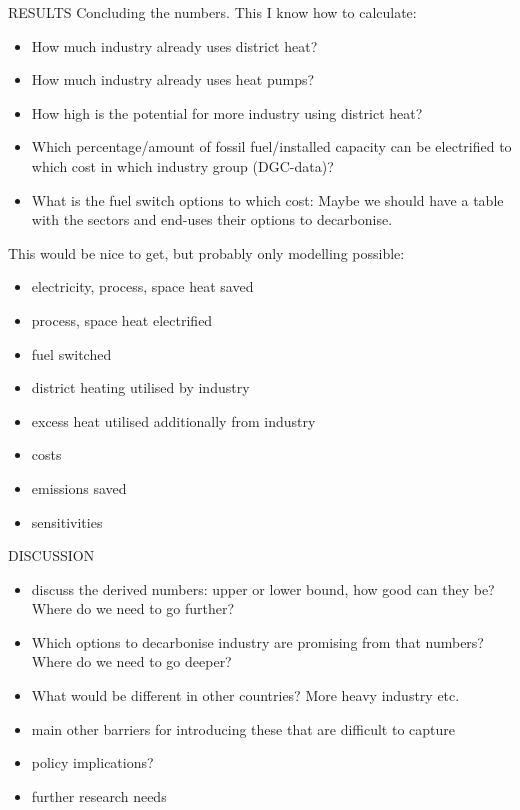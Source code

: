 \documentclass[review]{elsarticle}
\begin{document}
RESULTS
Concluding the numbers. This I know how to calculate:
\begin{itemize}
    \item How much industry already uses district heat?
    \item How much industry already uses heat pumps?
    \item How high is the potential for more industry using district heat?
    \item Which percentage/amount of fossil fuel/installed capacity can be electrified to which cost in which industry group (DGC-data)?
    \item What is the fuel switch options to which cost: Maybe we should have a table with the sectors and end-uses their options to decarbonise.
\end{itemize}
This would be nice to get, but probably only modelling possible:
\begin{itemize}
    \item electricity, process, space heat saved
    \item process, space heat electrified
    \item fuel switched
    \item district heating utilised by industry
    \item excess heat utilised additionally from industry
    \item costs
    \item emissions saved
    \item sensitivities
\end{itemize}

DISCUSSION
\begin{itemize}
    \item discuss the derived numbers: upper or lower bound, how good can they be? Where do we need to go further?
    \item Which options to decarbonise industry are promising from that numbers? Where do we need to go deeper?
    \item What would be different in other countries? More heavy industry etc.
    \item main other barriers for introducing these that are difficult to capture
    \item policy implications?
    \item further research needs
\end{itemize}
\end{document}
